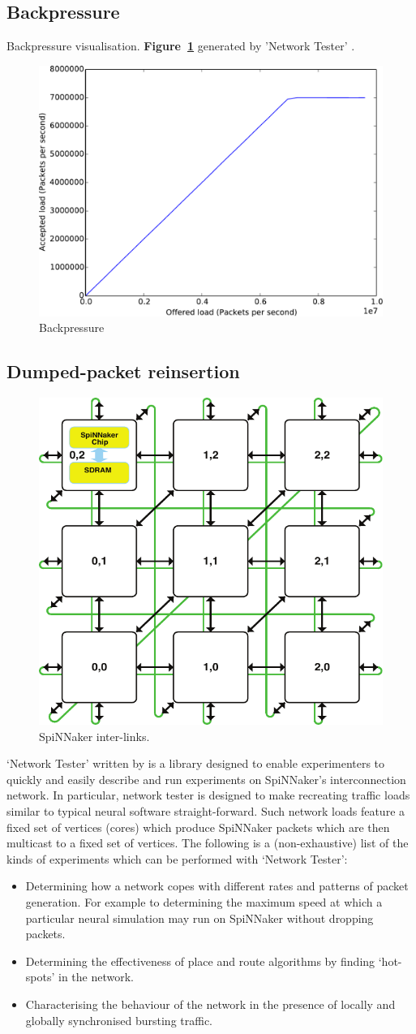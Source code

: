 \documentclass[a4paper, 11pt]{article}
\newlength\drop
\begin{document}
\subsection{Backpressure}
Backpressure visualisation. \textbf{Figure~\ref{fig:backpressure}} generated by 'Network Tester' \citep[see][]{heathcote2015networktester}.
\begin{figure}[htbp]
	\centering
	\includegraphics[width=0.5\linewidth]{images/backpressure2.pdf}
	\caption{Backpressure}	
	\label{fig:backpressure}
\end{figure}

\subsection{Dumped-packet reinsertion}
\begin{figure}[b]
	\centering
	\includegraphics[width=0.35\linewidth]{images/system_architecture.pdf}
	\caption{SpiNNaker inter-links.}
	\label{fig:interchip_links}	
\end{figure}

`Network Tester' written by \citet{heathcote2015networktester} is a library designed to enable experimenters to quickly and easily describe and run experiments on SpiNNaker's interconnection network. In particular, network tester is designed to make recreating traffic loads similar to typical neural software straight-forward. Such network loads feature a fixed set of vertices (cores) which produce SpiNNaker packets which are then multicast to a fixed set of vertices.
The following is a (non-exhaustive) list of the kinds of experiments which can be performed with `Network Tester':
\begin{itemize}
\item Determining how a network copes with different rates and patterns of packet generation. For example to determining the maximum speed at which a particular neural simulation may run on SpiNNaker without dropping
packets.
\item Determining the effectiveness of place and route algorithms by finding `hot-spots' in the network.
\item Characterising the behaviour of the network in the presence of locally and globally synchronised bursting traffic.
\end{itemize}
\end{document}
